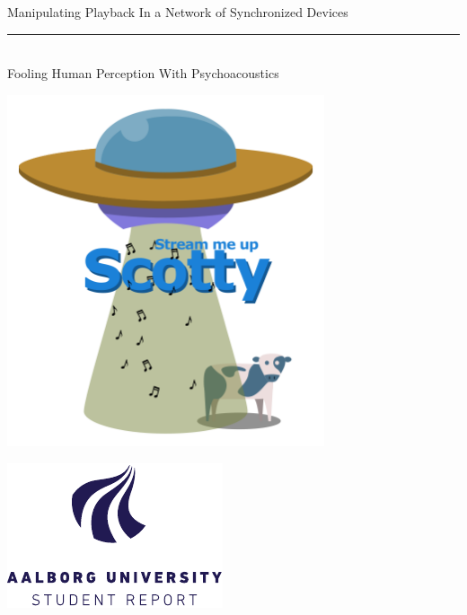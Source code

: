 %
\newcommand{\titlefont}{\sffamily\fontsize{34pt}{0pt}\selectfont}
\newcommand{\subtitlefont}{\sffamily\fontsize{26pt}{0pt}\selectfont}
\newcommand{\smallfont}{\sffamily\fontsize{12pt}{0pt}\selectfont}
\begin{titlepage}
    \noindent%
        \begin{center}
            \titlefont Manipulating Playback In a Network of Synchronized Devices\\
            \vspace{0.2cm}
            \rule{90pt}{1pt}\\
            \vspace{0.2cm}
            \subtitlefont Fooling Human Perception With Psychoacoustics
        \end{center}
    \null\vfill
    \begin{minipage}{1\textwidth}
        \centering
        \includegraphics[width=0.7\textwidth]{img/scotty_white.png}
    \end{minipage}
    \null\vfill
    \vspace*{1cm}
    \noindent
    \begin{minipage}{0.35\linewidth}
        \begin{flushleft}
        \includegraphics[width=0.8\linewidth]{img/aau_logo_en.pdf}

\end{flushleft}
\end{minipage}
\end{titlepage}
